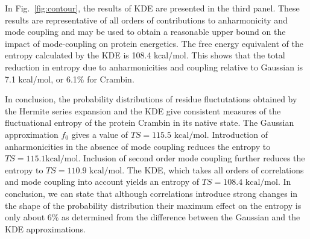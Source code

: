 \documentclass[12pt]{iopart}
\begin{document}
In Fig.~\ref{fig:contour}, the results of KDE are presented in the
third panel.  These results are representative of all orders of
contributions to anharmonicity and mode coupling and may be used to
obtain a reasonable upper bound on the impact of mode-coupling on
protein energetics.  The free energy equivalent of the entropy
calculated by the KDE is 108.4 kcal/mol.  This shows that the total
reduction in entropy due to anharmonicities and coupling relative to
Gaussian is 7.1 kcal/mol, or 6.1\% for Crambin.


In conclusion, the probability distributions of residue fluctutations
obtained by the Hermite series expansion and the KDE give consistent
measures of the fluctuational entropy of the protein Crambin in its
native state. The Gaussian approximation $f_0$ gives a value of $TS =
115.5 \mbox{ kcal/mol}$.  Introduction of anharmonicities in the
absence of mode coupling reduces the entropy to $TS = 115.1 \mbox{
kcal/mol}$.  Inclusion of second order mode coupling further reduces
the entropy to $TS=110.9 \mbox{ kcal/mol}$.  The KDE, which takes all
orders of correlations and mode coupling into account yields an
entropy of $TS = 108.4 \mbox{ kcal/mol}$.  In conclusion, we can state
that although correlations introduce strong changes in the shape of
the probability distribution their maximum effect on the entropy is
only about 6\% as determined from the difference between the Gaussian
and the KDE approximations.


\end{document}
